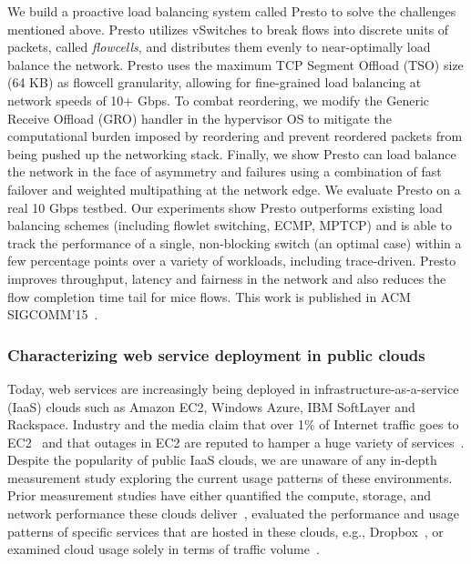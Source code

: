 We build a proactive load balancing system called Presto to solve the challenges 
mentioned above.
Presto utilizes vSwitches to break flows into discrete units of packets, called
{\em flowcells}, and distributes them evenly
to near-optimally load balance the network.
Presto uses the maximum TCP Segment Offload (TSO) size (64 KB) as flowcell granularity,
allowing for fine-grained load balancing at network speeds of 10+ Gbps.
To combat reordering, we modify the Generic Receive Offload (GRO) handler
in the hypervisor OS to mitigate the computational burden imposed by reordering
and prevent reordered packets from being pushed up the networking stack.
Finally, we show Presto can load balance the network
in the face of asymmetry and failures using a combination of fast failover and 
weighted multipathing at the network edge.
We evaluate Presto on a real 10 Gbps testbed. Our experiments show Presto
outperforms existing load balancing schemes (including flowlet switching, ECMP, MPTCP) and
is able to track the performance of a single, non-blocking switch (an optimal case) within a few percentage points
over a variety of workloads, including trace-driven. Presto improves throughput, latency and fairness in the network and
also reduces the flow completion time tail for mice flows. This work is published in ACM 
SIGCOMM'15~\cite{he2015presto}.

\subsubsection{Characterizing web service deployment in public clouds} 

Today, web services are
increasingly being deployed in infrastructure-as-a-service (IaaS) clouds such
as Amazon EC2, Windows Azure, IBM SoftLayer and Rackspace. Industry and the media claim
that over 1\% of Internet traffic goes to EC2~\cite{wiredarticle} and that outages in
EC2 are reputed to hamper a huge variety of
services~\cite{AWSoutage2011,AWSoutageOct2012,netflixoutage,wsjarticle}.
Despite the popularity of public IaaS clouds, we are unaware of any in-depth
measurement study exploring the current usage patterns of these environments.
Prior measurement studies have either quantified the compute, storage, and
network performance these clouds
deliver~\cite{li2010cloudcmp,li2011cloudprophet}, evaluated the
performance and usage patterns of specific services that are hosted in these
clouds, e.g., Dropbox~\cite{drago2012inside}, or examined cloud usage solely
in terms of traffic volume~\cite{deepfield}.

